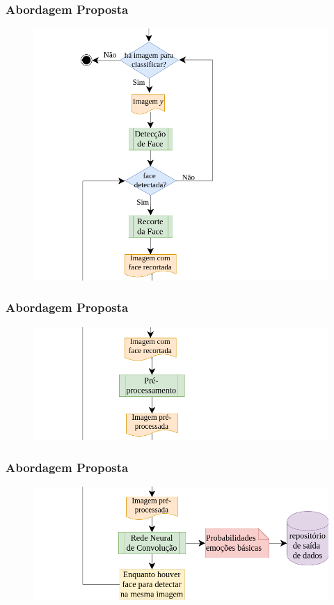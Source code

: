 \documentclass{beamer}
\begin{document}
\begin{frame}
\frametitle{Abordagem Proposta}
\begin{figure}
\centering
\includegraphics[scale=0.37]{figuras/arquitetura_2.png}
\label{fig:arquitetura2}
\end{figure}
\end{frame}

\begin{frame}
\frametitle{Abordagem Proposta}
\begin{figure}
\centering
\includegraphics[scale=0.37]{figuras/arquitetura_3.png}
\label{fig:arquitetura3}
\end{figure}
\end{frame}


\begin{frame}
\frametitle{Abordagem Proposta}
\begin{figure}
\centering
\includegraphics[scale=0.37]{figuras/arquitetura_4.png}
\label{fig:arquitetura4}
\end{figure}
\end{frame}
\end{document}
